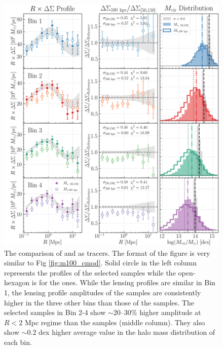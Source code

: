 \documentclass[fleqn,usenatbib,useAMS,english]{mnras}
\begin{document}
  \begin{figure}
      \centering
      \includegraphics[width=\textwidth]{figure/topn_fig_8}
      \caption{
          The \topn{} comparison of  and  as \mhalo{} tracers.
          The format of the figure is very similar to Fig \ref{fig:m100_cmod}.
          Solid circle in the left column represents the \rdsigma{} profiles of the 
          selected samples while the open-hexagon is for the  ones.
          While the lensing profiles are similar in Bin 1, the lensing profile amplitudes of the
           samples are consistently higher in the three other bins than those of
          the  samples.
          The  selected samples in Bin 2-4 show $\sim 20$--30\% higher \dsigma{}
          amplitude at $R<2$ Mpc regime than the  samples (middle column).
          They also show $\sim 0.2$ dex higher average \mvir{} value in the halo mass
          distribution of each bin.
          }
      \label{fig:m100_mout}
  \end{figure}
\end{document}
